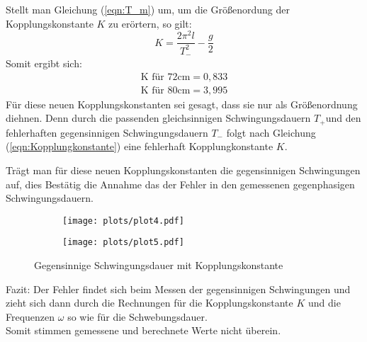 Stellt man Gleichung (\ref{eqn:T_m}) um, um die Größenordung der Kopplungskonstante $K$ zu erörtern, so gilt:
\begin{equation}
    K=\frac{2\pi^2l}{T_{-}^2}-\frac{g}{2}
\end{equation}
Somit ergibt sich:
\begin{align*}
    \textrm{K für 72cm} = 0,833\\
    \textrm{K für 80cm} = 3,995 
\end{align*}
Für diese neuen Kopplungskonstanten sei gesagt, dass sie nur als Größenordnung diehnen.
Denn durch die passenden gleichsinnigen Schwingungsdauern $T_+$und den fehlerhaften gegensinnigen Schwingungsdauern $T_-$
folgt nach Gleichung (\ref{eqn:Kopplungkonstante}) eine fehlerhaft Kopplungkonstante $K$.
 
Trägt man für diese neuen Kopplungskonstanten die gegensinnigen Schwingungen auf, dies Bestätig die Annahme
das der Fehler in den gemessenen gegenphasigen Schwingungsdauern.  
\begin{figure}
    \begin{subfigure}[c]{0.5\textwidth}
        \texttt{[image: plots/plot4.pdf]}
    \end{subfigure}
    \begin{subfigure}[c]{0.5\textwidth}
        \texttt{[image: plots/plot5.pdf]}
        \label{subfig:gegenNEU80}
    \end{subfigure}
    \caption{Gegensinnige Schwingungsdauer mit Kopplungskonstante}
\end{figure}

Fazit: Der Fehler findet sich beim Messen der gegensinnigen Schwingungen und
zieht sich dann durch die Rechnungen für die Kopplungskonstante $K$ und die Frequenzen $\omega$
so wie für die Schwebungsdauer.\\
Somit stimmen gemessene und berechnete Werte nicht überein.


